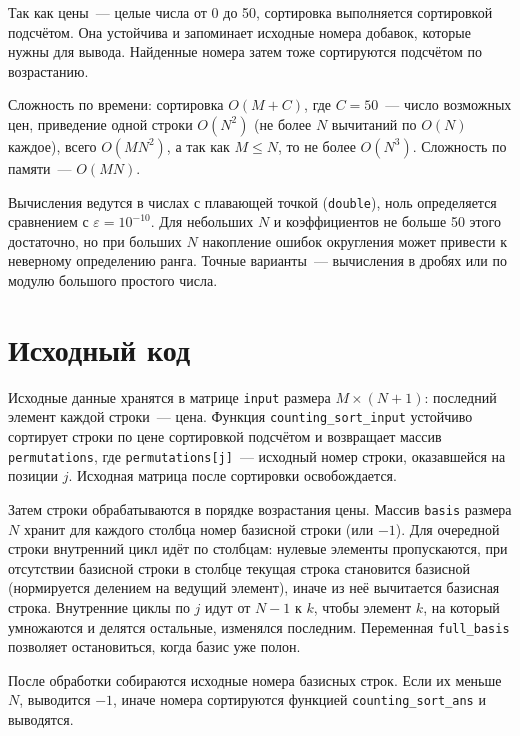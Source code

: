 Так как цены~--- целые числа от 0 до 50, сортировка выполняется сортировкой подсчётом. Она устойчива и запоминает исходные номера добавок, которые нужны для вывода. Найденные номера затем тоже сортируются подсчётом по возрастанию.

Сложность по времени: сортировка $O(M + C)$, где $C = 50$~--- число возможных цен, приведение одной строки $O(N^2)$ (не более $N$ вычитаний по $O(N)$ каждое), всего $O(MN^2)$, а так как $M \le N$, то не более $O(N^3)$. Сложность по памяти~--- $O(MN)$.

Вычисления ведутся в числах с плавающей точкой (\texttt{double}), ноль определяется сравнением с $\varepsilon = 10^{-10}$. Для небольших $N$ и коэффициентов не больше 50 этого достаточно, но при больших $N$ накопление ошибок округления может привести к неверному определению ранга. Точные варианты~--- вычисления в дробях или по модулю большого простого числа.

\pagebreak

\section{Исходный код}
Исходные данные хранятся в матрице \texttt{input} размера $M \times (N+1)$: последний элемент каждой строки~--- цена. Функция \texttt{counting\_sort\_input} устойчиво сортирует строки по цене сортировкой подсчётом и возвращает массив \texttt{permutations}, где \texttt{permutations[j]}~--- исходный номер строки, оказавшейся на позиции $j$. Исходная матрица после сортировки освобождается.

Затем строки обрабатываются в порядке возрастания цены. Массив \texttt{basis} размера $N$ хранит для каждого столбца номер базисной строки (или $-1$). Для очередной строки внутренний цикл идёт по столбцам: нулевые элементы пропускаются, при отсутствии базисной строки в столбце текущая строка становится базисной (нормируется делением на ведущий элемент), иначе из неё вычитается базисная строка. Внутренние циклы по $j$ идут от $N-1$ к $k$, чтобы элемент $k$, на который умножаются и делятся остальные, изменялся последним. Переменная \texttt{full\_basis} позволяет остановиться, когда базис уже полон.

После обработки собираются исходные номера базисных строк. Если их меньше $N$, выводится $-1$, иначе номера сортируются функцией \texttt{counting\_sort\_ans} и выводятся.

